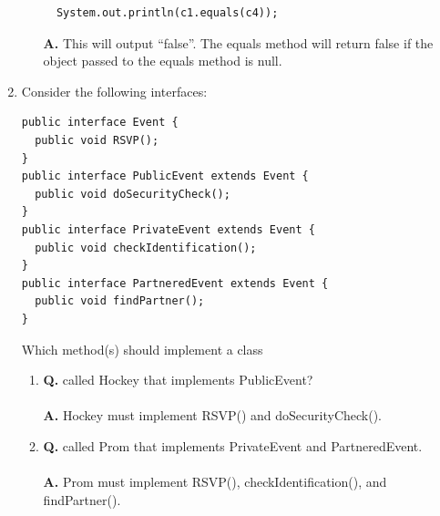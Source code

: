 \documentclass[12pt]{article}
\begin{document}
\begin{enumerate}
\begin{enumerate}[label=\Alph*]
\begin{lstlisting}
  System.out.println(c1.equals(c4));
  \end{lstlisting}
  \textbf{A.} This will output ``false''. The equals method will return false if the object passed to the equals method is null.
  \end{enumerate}
  \item Consider the following interfaces:
  \begin{lstlisting}
public interface Event {
  public void RSVP();
}
public interface PublicEvent extends Event {
  public void doSecurityCheck();
}
public interface PrivateEvent extends Event {
  public void checkIdentification();
}
public interface PartneredEvent extends Event {
  public void findPartner();
}
  \end{lstlisting}
  Which method(s) should implement a class
    \begin{enumerate}[label=\Alph*]
    \item \textbf{Q.} called Hockey that implements PublicEvent?
    \\\\
    \textbf{A.} Hockey must implement RSVP() and doSecurityCheck().
    \\
    \item \textbf{Q.} called Prom that implements PrivateEvent and PartneredEvent.
    \\\\
    \textbf{A.} Prom must implement RSVP(), checkIdentification(), and findPartner().
  \end{enumerate}
\end{enumerate}

 
\end{document}
